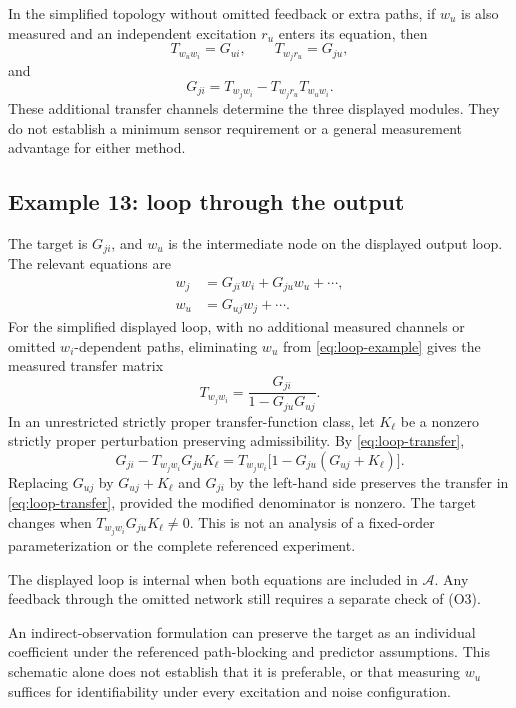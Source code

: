 \documentclass[11pt,a4paper]{article}
\newcommand{\Aset}{\mathcal A}
\begin{document}
In the simplified topology without omitted feedback or extra paths, if $w_u$ is also measured and an independent excitation $r_u$ enters its equation, then
\[
  T_{w_uw_i}=G_{ui},
  \qquad
  T_{w_jr_u}=G_{ju},
\]
and
\begin{equation}
  G_{ji}
  =T_{w_jw_i}-T_{w_jr_u}T_{w_uw_i}.
  \label{eq:parallel-recovery}
\end{equation}
These additional transfer channels determine the three displayed modules.  They do not establish a minimum sensor requirement or a general measurement advantage for either method.

\subsection{Example 13: loop through the output}

The target is $G_{ji}$, and $w_u$ is the intermediate node on the displayed output loop.  The relevant equations are
\begin{align}
  w_j&=G_{ji}w_i+G_{ju}w_u+\cdots,\\
  w_u&=G_{uj}w_j+\cdots.
  \label{eq:loop-example}
\end{align}
For the simplified displayed loop, with no additional measured channels or omitted $w_i$-dependent paths, eliminating $w_u$ from \eqref{eq:loop-example} gives the measured transfer matrix
\begin{equation}
  T_{w_jw_i}
  =\frac{G_{ji}}{1-G_{ju}G_{uj}}.
  \label{eq:loop-transfer}
\end{equation}
In an unrestricted strictly proper transfer-function class, let $K_{\ell}$ be a nonzero strictly proper perturbation preserving admissibility.  By \eqref{eq:loop-transfer},
\[
  G_{ji}-T_{w_jw_i}G_{ju}K_{\ell}
  =T_{w_jw_i}\bigl[1-G_{ju}(G_{uj}+K_{\ell})\bigr].
\]
Replacing $G_{uj}$ by $G_{uj}+K_{\ell}$ and $G_{ji}$ by the left-hand side preserves the transfer in \eqref{eq:loop-transfer}, provided the modified denominator is nonzero.  The target changes when $T_{w_jw_i}G_{ju}K_{\ell}\ne0$.  This is not an analysis of a fixed-order parameterization or the complete referenced experiment.

The displayed loop is internal when both equations are included in $\Aset$.  Any feedback through the omitted network still requires a separate check of (O3).

An indirect-observation formulation can preserve the target as an individual coefficient under the referenced path-blocking and predictor assumptions.  This schematic alone does not establish that it is preferable, or that measuring $w_u$ suffices for identifiability under every excitation and noise configuration.
\end{document}
